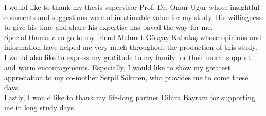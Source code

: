 I would like to thank my thesis supervisor Prof. Dr. Omur Ugur whose insightful comments and suggestions were of inestimable value for my study. His willingness to give his time and share his expertise has paved the way for me. \\

Special thanks also go to my friend Mehmet Gökçay Kabataş whose opinions and information have helped me very much throughout the production of this study. \\

I would also like to express my gratitude to my family for their moral support and warm encouragements. Especially, I would like to show my greatest appreciation to my co-mother Serpil Sökmen, who provides me to come these days. \\

Lastly, I would like to thank my life-long partner Dilara Bayram for supporting me in long study days. \\

